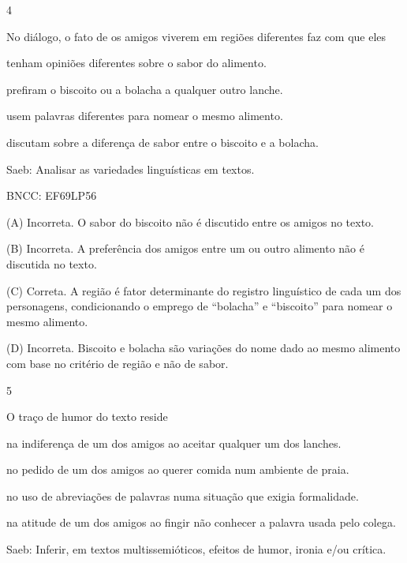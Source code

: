 
\num{4}

No diálogo, o fato de os amigos viverem em regiões diferentes faz com
que eles

\begin{escolha}
\item tenham opiniões diferentes sobre o sabor do alimento.

\item prefiram o biscoito ou a bolacha a qualquer outro lanche.

\item usem palavras diferentes para nomear o mesmo alimento.

\item discutam sobre a diferença de sabor entre o biscoito e a bolacha.
\end{escolha}

Saeb: Analisar as variedades linguísticas em textos.

BNCC: EF69LP56

(A) Incorreta. O sabor do biscoito não é discutido entre os amigos no
texto.

(B) Incorreta. A preferência dos amigos entre um ou outro alimento não é
discutida no texto.

(C) Correta. A região é fator determinante do registro linguístico de
cada um dos personagens, condicionando o emprego de ``bolacha'' e
``biscoito'' para nomear o mesmo alimento.

(D) Incorreta. Biscoito e bolacha são variações do nome dado ao mesmo
alimento com base no critério de região e não de sabor.

\num{5}

O traço de humor do texto reside

\begin{escolha}
\item na indiferença de um dos amigos ao aceitar qualquer um dos lanches.

\item no pedido de um dos amigos ao querer comida num ambiente de praia.

\item no uso de abreviações de palavras numa situação que exigia
formalidade.

\item na atitude de um dos amigos ao fingir não conhecer a palavra usada
pelo colega.
\end{escolha}

Saeb: Inferir, em textos multissemióticos, efeitos de humor, ironia e/ou
crítica.

